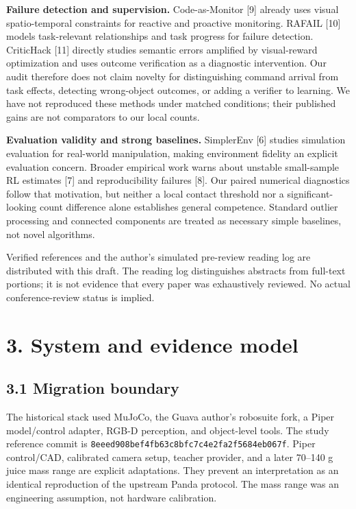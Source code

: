 \documentclass[10pt]{article}
\begin{document}
\textbf{Failure detection and supervision.} Code-as-Monitor [9] already uses visual spatio-temporal constraints for reactive and proactive monitoring. RAFAIL [10] models task-relevant relationships and task progress for failure detection. CriticHack [11] directly studies semantic errors amplified by visual-reward optimization and uses outcome verification as a diagnostic intervention. Our audit therefore does not claim novelty for distinguishing command arrival from task effects, detecting wrong-object outcomes, or adding a verifier to learning. We have not reproduced these methods under matched conditions; their published gains are not comparators to our local counts.

\textbf{Evaluation validity and strong baselines.} SimplerEnv [6] studies simulation evaluation for real-world manipulation, making environment fidelity an explicit evaluation concern. Broader empirical work warns about unstable small-sample RL estimates [7] and reproducibility failures [8]. Our paired numerical diagnostics follow that motivation, but neither a local contact threshold nor a significant-looking count difference alone establishes general competence. Standard outlier processing and connected components are treated as necessary simple baselines, not novel algorithms.

Verified references and the author's simulated pre-review reading log are distributed with this draft. The reading log distinguishes abstracts from full-text portions; it is not evidence that every paper was exhaustively reviewed. No actual conference-review status is implied.

\section*{3. System and evidence model}

\subsection*{3.1 Migration boundary}

The historical stack used MuJoCo, the Guava author's robosuite fork, a Piper model/control adapter, RGB-D perception, and object-level tools. The study reference commit is \texttt{8eeed908bef4fb63c8bfc7c4e2fa2f5684eb067f}. Piper control/CAD, calibrated camera setup, teacher provider, and a later 70--140 g juice mass range are explicit adaptations. They prevent an interpretation as an identical reproduction of the upstream Panda protocol. The mass range was an engineering assumption, not hardware calibration.
\end{document}
